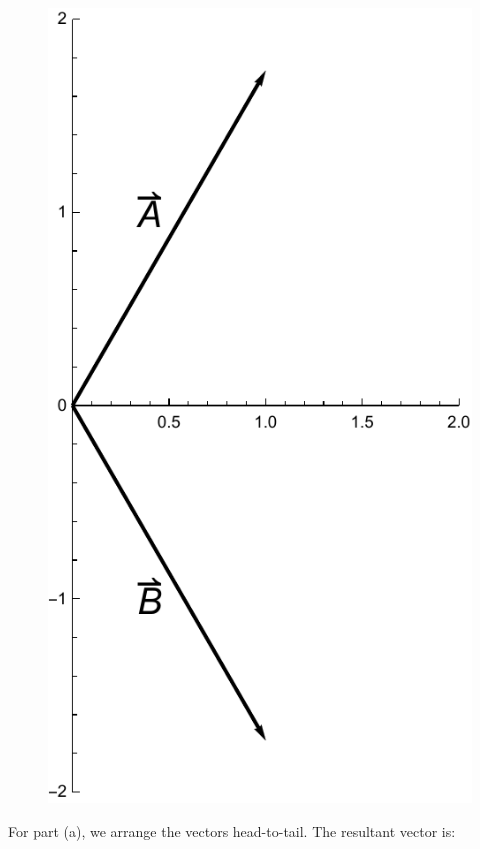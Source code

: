 \documentclass{amsart}
\begin{document}
\begin{figure}[h]
\includegraphics[scale=0.32]{1-22a}
\end{figure}

For part (a), we arrange the vectors head-to-tail.  The resultant vector is:
\end{document}
